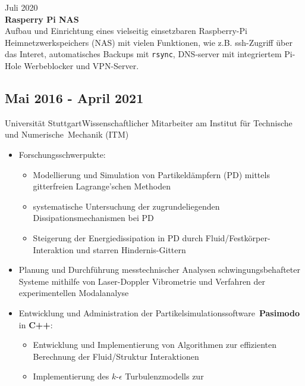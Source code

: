 \documentclass{mycv}
\begin{document}
\begin{paracol}{2}
	{\RaggedLeft Juli 2020\\ \bfseries Rasperry Pi NAS\\}
	Aufbau und Einrichtung eines vielseitig einsetzbaren Raspberry-Pi
	Heimnetzwerkspeichers (NAS) mit vielen Funktionen, wie z.B.
	ssh-Zugriff {\"u}ber das Interet, automatisches Backups mit \verb|rsync|,
	DNS-server mit integriertem Pi-Hole Werbeblocker und	VPN-Server.

\switchcolumn
{}%

\subsection{Mai 2016 - April 2021}{Universit{\"a}t
Stuttgart}{Wissenschaftlicher Mitarbeiter am Institut f{\"u}r
Technische und Numerische \,Mechanik (ITM)}
	  \begin{itemize}
			\item Forschungsschwerpukte: 
				\begin{itemize}
					\item Modellierung und Simulation von Partikeld{\"a}mpfern (PD) mittels
						gitterfreien Lagrange\-'schen Methoden
			    \item systematische Untersuchung der zugrundeliegenden
			    	Dissipationsmechanismen bei PD 
			    \item Steigerung der Energiedissipation in PD durch
			    	Fluid/Festk{\"o}rper-Interaktion und starren Hindernis-Gittern 
		\end{itemize}
			\item Planung und Durchf{\"u}hrung messtechnischer Analysen
				schwingungsbehafteter Systeme mithilfe von Laser-Doppler Vibrometrie
				und Verfahren der experimentellen Modalanalyse
			\item Entwicklung und Administration der Partikelsimulationssoftware
			{\bfseries \,Pasimodo} in {\bfseries C++}:
			\begin{itemize}
				\item Entwicklung und Implementierung von Algorithmen zur effizienten
					Berechnung der Fluid/Struktur Interaktionen 
				\item Implementierung des $k$-$\epsilon$ Turbulenzmodells zur

\end{itemize}
\end{itemize}
\end{paracol}
\end{document}
